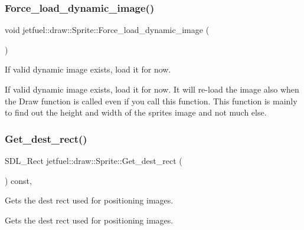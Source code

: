 \subsubsection{\texorpdfstring{Force\+\_\+load\+\_\+dynamic\+\_\+image()}{Force\_load\_dynamic\_image()}}
{\footnotesize\ttfamily void jetfuel\+::draw\+::\+Sprite\+::\+Force\+\_\+load\+\_\+dynamic\+\_\+image (\begin{DoxyParamCaption}{ }\end{DoxyParamCaption})\hspace{0.3cm}{\ttfamily [inline]}}



If valid dynamic image exists, load it for now. 

If valid dynamic image exists, load it for now. It will re-\/load the image also when the Draw function is called even if you call this function. This function is mainly to find out the height and width of the sprite\textquotesingle{}s image and not much else. \mbox{\label{classjetfuel_1_1draw_1_1Sprite_aa5de791f11c4a8ee1a098963abbe4d18}} 
\subsubsection{\texorpdfstring{Get\+\_\+dest\+\_\+rect()}{Get\_dest\_rect()}}
{\footnotesize\ttfamily S\+D\+L\+\_\+\+Rect jetfuel\+::draw\+::\+Sprite\+::\+Get\+\_\+dest\+\_\+rect (\begin{DoxyParamCaption}{ }\end{DoxyParamCaption}) const\hspace{0.3cm}{\ttfamily [inline]}, {\ttfamily [protected]}}



Gets the dest rect used for positioning images. 

Gets the dest rect used for positioning images. \mbox{\label{classjetfuel_1_1draw_1_1Sprite_a2cd3f83c4fc573be82d3dc3a9c70e317}} 
